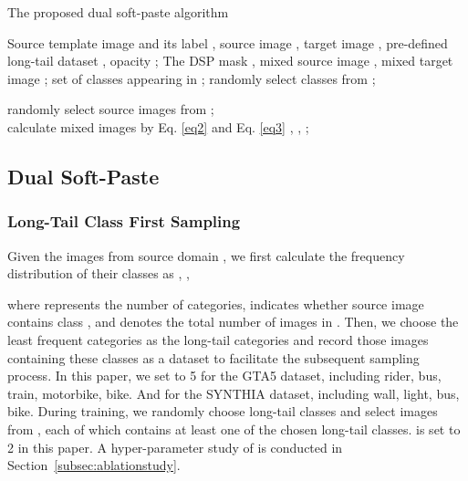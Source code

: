 \documentclass[sigconf]{acmart}
\begin{document}
\renewcommand{\algorithmicrequire}{\textbf{Input:}}  \renewcommand{\algorithmicensure}{\textbf{Output:}} \begin{algorithm}[t]  
  \caption{The proposed dual soft-paste algorithm}  
  \begin{algorithmic}[1]  
    \Require  
       Source template image  and its label , source image , target image , pre-defined long-tail dataset , opacity ;
    \Ensure  
      The DSP mask , mixed source image , mixed target image ;  
    \State  set of classes appearing in  ;  
    \State  randomly select  classes from ;  
    
      \State 
 
    \EndFor 
    \State  randomly select source images from ; 
        \If{} 
        \EndIf
    \EndFor \\
     calculate mixed images by Eq. \ref{eq2} and Eq. \ref{eq3}
    \label{code:recentEnd}
    \State \Return , , ;
  \end{algorithmic}  
\end{algorithm}  


\subsection{Dual Soft-Paste}
\subsubsection{Long-Tail Class First Sampling}
Given the images from source domain , we first calculate the frequency distribution of their classes as , ,

where  represents the number of categories,  indicates whether  source image contains class , and  denotes the total number of images in . Then, we choose the least frequent  categories as the long-tail categories and record those images containing these classes as a dataset  to facilitate the subsequent sampling process. In this paper, we set  to 5 for the GTA5 dataset, including rider, bus, train, motorbike, bike. And  for the SYNTHIA dataset, including wall, light, bus, bike. During training, we randomly choose  long-tail classes and select  images from , each of which contains at least one of the chosen long-tail classes.  is set to 2 in this paper. A hyper-parameter study of  is conducted in Section~\ref{subsec:ablationstudy}.
\end{document}
